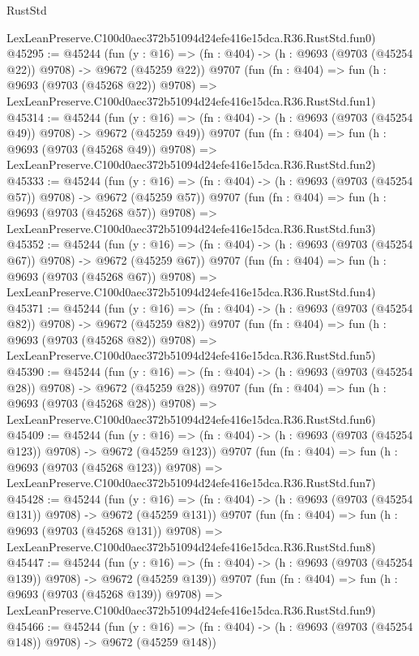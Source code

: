 \begin{lexlean}{RustStd}
\begin{coremodule}
    LexLeanPreserve.C100d0aec372b51094d24efe416e15dca.R36.RustStd.fun0)
@45295 := @45244
    (fun (y : @16) => (fn : @404) -> (h : @9693 (@9703 (@45254 @22)) @9708) -> @9672 (@45259 @22))
    @9707
    (fun (fn : @404) =>
    fun (h : @9693 (@9703 (@45268 @22)) @9708) =>
    LexLeanPreserve.C100d0aec372b51094d24efe416e15dca.R36.RustStd.fun1)
@45314 := @45244
    (fun (y : @16) => (fn : @404) -> (h : @9693 (@9703 (@45254 @49)) @9708) -> @9672 (@45259 @49))
    @9707
    (fun (fn : @404) =>
    fun (h : @9693 (@9703 (@45268 @49)) @9708) =>
    LexLeanPreserve.C100d0aec372b51094d24efe416e15dca.R36.RustStd.fun2)
@45333 := @45244
    (fun (y : @16) => (fn : @404) -> (h : @9693 (@9703 (@45254 @57)) @9708) -> @9672 (@45259 @57))
    @9707
    (fun (fn : @404) =>
    fun (h : @9693 (@9703 (@45268 @57)) @9708) =>
    LexLeanPreserve.C100d0aec372b51094d24efe416e15dca.R36.RustStd.fun3)
@45352 := @45244
    (fun (y : @16) => (fn : @404) -> (h : @9693 (@9703 (@45254 @67)) @9708) -> @9672 (@45259 @67))
    @9707
    (fun (fn : @404) =>
    fun (h : @9693 (@9703 (@45268 @67)) @9708) =>
    LexLeanPreserve.C100d0aec372b51094d24efe416e15dca.R36.RustStd.fun4)
@45371 := @45244
    (fun (y : @16) => (fn : @404) -> (h : @9693 (@9703 (@45254 @82)) @9708) -> @9672 (@45259 @82))
    @9707
    (fun (fn : @404) =>
    fun (h : @9693 (@9703 (@45268 @82)) @9708) =>
    LexLeanPreserve.C100d0aec372b51094d24efe416e15dca.R36.RustStd.fun5)
@45390 := @45244
    (fun (y : @16) => (fn : @404) -> (h : @9693 (@9703 (@45254 @28)) @9708) -> @9672 (@45259 @28))
    @9707
    (fun (fn : @404) =>
    fun (h : @9693 (@9703 (@45268 @28)) @9708) =>
    LexLeanPreserve.C100d0aec372b51094d24efe416e15dca.R36.RustStd.fun6)
@45409 := @45244
    (fun (y : @16) => (fn : @404) -> (h : @9693 (@9703 (@45254 @123)) @9708) -> @9672 (@45259 @123))
    @9707
    (fun (fn : @404) =>
    fun (h : @9693 (@9703 (@45268 @123)) @9708) =>
    LexLeanPreserve.C100d0aec372b51094d24efe416e15dca.R36.RustStd.fun7)
@45428 := @45244
    (fun (y : @16) => (fn : @404) -> (h : @9693 (@9703 (@45254 @131)) @9708) -> @9672 (@45259 @131))
    @9707
    (fun (fn : @404) =>
    fun (h : @9693 (@9703 (@45268 @131)) @9708) =>
    LexLeanPreserve.C100d0aec372b51094d24efe416e15dca.R36.RustStd.fun8)
@45447 := @45244
    (fun (y : @16) => (fn : @404) -> (h : @9693 (@9703 (@45254 @139)) @9708) -> @9672 (@45259 @139))
    @9707
    (fun (fn : @404) =>
    fun (h : @9693 (@9703 (@45268 @139)) @9708) =>
    LexLeanPreserve.C100d0aec372b51094d24efe416e15dca.R36.RustStd.fun9)
@45466 := @45244
    (fun (y : @16) => (fn : @404) -> (h : @9693 (@9703 (@45254 @148)) @9708) -> @9672 (@45259 @148))

\end{coremodule}
\end{lexlean}
